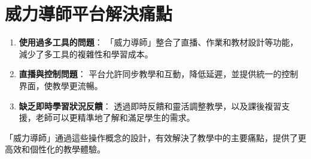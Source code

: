\documentclass[12pt]{article}
\begin{document}
\section{威力導師平台解決痛點}

\begin{enumerate}[label=\textbf{\arabic*.}]
 
  \item \textbf{使用過多工具的問題}：
  「威力導師」整合了直播、作業和教材設計等功能，減少了多工具的複雜性和學習成本。
  \item \textbf{直播與控制問題}：
  平台允許同步教學和互動，降低延遲，並提供統一的控制界面，使教學更流暢。
   \item \textbf{缺乏即時學習狀況反饋}：
  透過即時反饋和靈活調整教學，以及課後複習支援，老師可以更精準地了解和滿足學生的需求。
\end{enumerate}

「威力導師」通過這些操作概念的設計，有效解決了教學中的主要痛點，提供了更高效和個性化的教學體驗。
  
\end{document}
